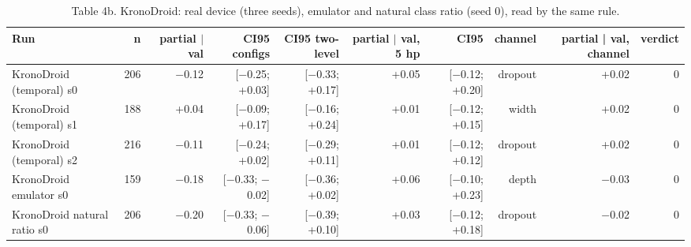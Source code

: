 \begin{table}[t]
\centering\small
\caption{Table 4b. KronoDroid: real device (three seeds), emulator and natural class ratio (seed 0), read by the same rule.}
\label{tab:kronodroid_variants}
\begin{tabular}{lrrrrrrrrr}
\toprule
Run & n & partial $\mid$ val & CI95 configs & CI95 two-level & partial $\mid$ val, 5 hp & CI95 & channel & partial | val, channel & verdict \\
\midrule
KronoDroid (temporal) s0 & 206 & $-$0.12 & [$-$0.25; +0.03] & [$-$0.33; +0.17] & +0.05 & [$-$0.12; +0.20] & dropout & +0.02 & 0 \\
KronoDroid (temporal) s1 & 188 & +0.04 & [$-$0.09; +0.17] & [$-$0.16; +0.24] & +0.01 & [$-$0.12; +0.15] & width & +0.02 & 0 \\
KronoDroid (temporal) s2 & 216 & $-$0.11 & [$-$0.24; +0.02] & [$-$0.29; +0.11] & +0.01 & [$-$0.12; +0.12] & dropout & +0.02 & 0 \\
KronoDroid emulator s0 & 159 & $-$0.18 & [$-$0.33; $-$0.02] & [$-$0.36; +0.02] & +0.06 & [$-$0.10; +0.23] & depth & $-$0.03 & 0 \\
KronoDroid natural ratio s0 & 206 & $-$0.20 & [$-$0.33; $-$0.06] & [$-$0.39; +0.10] & +0.03 & [$-$0.12; +0.18] & dropout & $-$0.02 & 0 \\
\bottomrule
\end{tabular}
\end{table}
